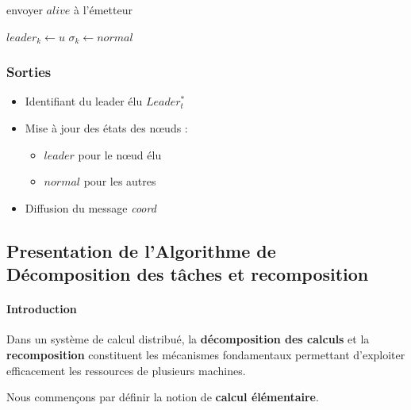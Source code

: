 \documentclass[12pt,a4paper]{report}
\theoremstyle{definition}
\begin{document}
\begin{algorithm}
\caption{Traitement des messages d'élection}
\begin{algorithmic}[1]
        \State envoyer $alive$ à l’émetteur
        \State {}
    \EndIf
\EndProcedure

    \State $leader_k \gets u$
    \State $\sigma_k \gets normal$
\EndProcedure
\end{algorithmic}
\end{algorithm}

\subsubsection{Sorties}

\begin{itemize}
    \item [$\bullet$]Identifiant du leader élu $Leader^*_t$
    \item[$\bullet$] Mise à jour des états des nœuds :
    \begin{itemize}
        \item[$-$] $leader$ pour le nœud élu
        \item[$-$] $normal$ pour les autres
    \end{itemize}
    \item[$\bullet$] Diffusion du message \textit{coord}
\end{itemize}
\newpage



\subsection{Presentation de l'Algorithme de Décomposition des tâches et recomposition}

\paragraph{Introduction}

Dans un système de calcul distribué, la \textbf{décomposition des calculs}  et la \textbf{recomposition}  constituent les mécanismes fondamentaux permettant d'exploiter efficacement les ressources de plusieurs machines.

Nous commençons par définir la notion de \textbf{calcul élémentaire}.
\end{document}
